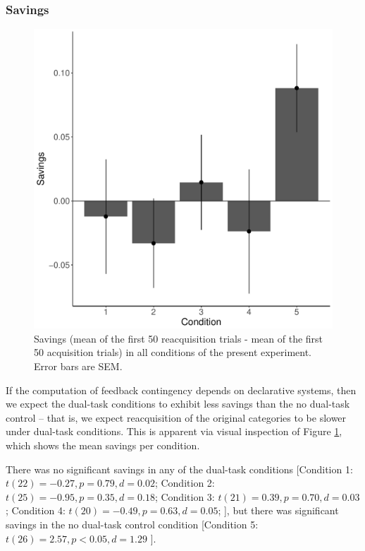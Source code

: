 \documentclass[man,apacite,draftfirst]{apa6}
\begin{document}
\subsubsection*{Savings}
\begin{figure}[t]
\centering \includegraphics[width=1.0\textwidth]{../figures/fig_savings.pdf}
\caption{Savings (mean of the first 50 reacquisition trials - mean of the first
  50 acquisition trials) in all conditions of the present experiment.
  Error bars are SEM.}
  \label{fig:savings}
\end{figure}

If the computation of feedback contingency depends on declarative systems, then
we expect the dual-task conditions to exhibit less savings than the no dual-task
control -- that is, we expect reacquisition of the original categories to be
slower under dual-task conditions. This is apparent via visual inspection of
Figure \ref{fig:savings}, which shows the mean savings per condition.

There was no significant savings in any of the dual-task conditions [Condition
1: $t(22) = -0.27, p = 0.79, d = 0.02$; Condition 2: $t(25) = -0.95, p = 0.35, d
= 0.18$; Condition 3: $t(21) = 0.39, p = 0.70, d = 0.03$; Condition 4: $t(20) =
-0.49, p = 0.63, d = 0.05$; ], but there was significant savings in the no
dual-task control condition [Condition 5: $t(26) = 2.57, p < 0.05, d = 1.29$ ].
\end{document}
